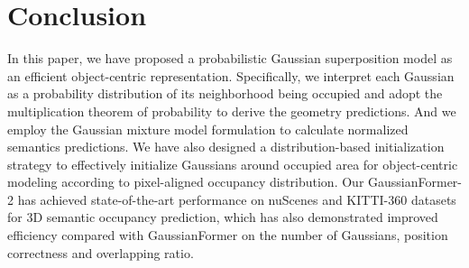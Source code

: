 \section{Conclusion}
\label{sec: conclusion}

In this paper, we have proposed a probabilistic Gaussian superposition model as an efficient object-centric representation.
Specifically, we interpret each Gaussian as a probability distribution of its neighborhood being occupied and adopt the multiplication theorem of probability to derive the geometry predictions.
And we employ the Gaussian mixture model formulation to calculate normalized semantics predictions.
We have also designed a distribution-based initialization strategy to effectively initialize Gaussians around occupied area for object-centric modeling according to pixel-aligned occupancy distribution.
Our GaussianFormer-2 has achieved state-of-the-art performance on nuScenes and KITTI-360 datasets for 3D semantic occupancy prediction, which has also demonstrated improved efficiency compared with GaussianFormer on the number of Gaussians, position correctness and overlapping ratio.

